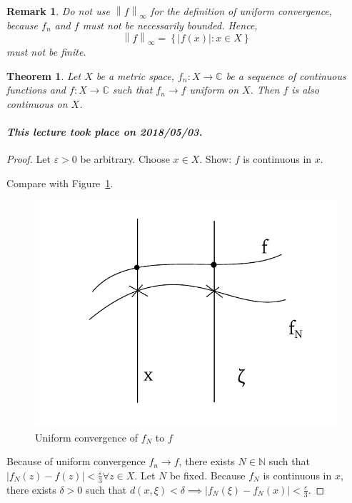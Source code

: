 \documentclass{article}
\newtheorem{theorem}{Theorem}  \numberwithin{theorem}{section}
\newtheorem{remark}{Remark}  \numberwithin{remark}{section}
\newcommand{\set}[1]{\left\{#1\right\}}
\newcommand{\norm}[1]{\left\|#1\right\|}
\newcommand{\card}[1]{\left|#1\right|}
\newcommand{\dateref}[1]{\paragraph{\textit{This lecture took place on #1.}}}
\begin{document}
\begin{remark}
  Do not use $\norm{f}_{\infty}$ for the definition of uniform convergence,
  because $f_n$ and $f$ must not be necessarily bounded. Hence,
  \[ \norm{f}_\infty = \set{\card{f(x)}: x \in X} \]
  must not be finite.
\end{remark}

\begin{theorem} %
  \label{satz1cont}
  Let $X$ be a metric space, $f_n: X \to \mathbb C$ be a sequence of continuous functions and $f: X \to \mathbb C$ such that
  $f_n \to f$ uniform on $X$. Then $f$ is also continuous on $X$.
\end{theorem}

\dateref{2018/05/03}

\begin{proof}
  Let $\varepsilon > 0$ be arbitrary.
  Choose $x \in X$. Show: $f$ is continuous in $x$.

  Compare with Figure~\ref{img:uniconv}.

  \begin{figure}[t]
    \begin{center}
      \includegraphics{img/25_uniform_convergence_of_fN_to_f.pdf}
      \caption{Uniform convergence of $f_N$ to $f$}
      \label{img:uniconv}
    \end{center}
  \end{figure}

  Because of uniform convergence $f_n \to f$, there exists $N \in \mathbb N$ such that $\card{f_N(z) - f(z)} < \frac\varepsilon3 \forall z \in X$.
  Let $N$ be fixed. Because $f_N$ is continuous in $x$, there exists $\delta > 0$ such that $d(x, \xi) < \delta \implies \card{f_N(\xi) - f_N(x)} < \frac\varepsilon3$.


\end{proof}
\end{document}
